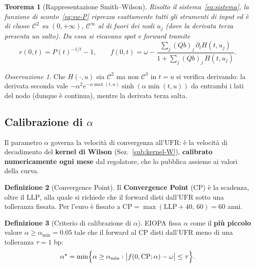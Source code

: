 \documentclass[11pt,a4paper]{article}
\theoremstyle{plain}
\newtheorem{teorema}{Teorema}[section]
\theoremstyle{definition}
\newtheorem{definizione}[teorema]{Definizione}
\theoremstyle{remark}
\newtheorem*{osservazione}{Osservazione}
\newcommand{\UFR}{\mathrm{UFR}}
\newcommand{\LLP}{\mathrm{LLP}}
\newcommand{\CP}{\mathrm{CP}}
\begin{document}
\begin{teorema}[Rappresentazione Smith--Wilson]
\label{thm:rappresentazione}
Risolto il sistema~\eqref{eq:sistema}, la funzione di sconto~\eqref{eq:sw-P} riprezza
esattamente tutti gli strumenti di input ed \`e di classe $\mathcal{C}^2$ su $(0,+\infty)$,
$\mathcal{C}^\infty$ al di fuori dei nodi $u_j$ (dove la derivata terza presenta un salto).
Da essa si ricavano spot e forward tramite
\[
  r(0,t) = P(t)^{-1/t}-1, \qquad
  f(0,t) = \omega - \frac{\sum_j (Qb)_j\,\partial_t H(t,u_j)}{1 + \sum_j (Qb)_j\, H(t,u_j)} .
\]
\end{teorema}

\begin{osservazione}
Che $H(\cdot,u)$ sia $\mathcal{C}^2$ ma non $\mathcal{C}^3$ in $t=u$ si verifica derivando:
la derivata seconda vale $-\alpha^2 e^{-\alpha\max(t,u)}\sinh(\alpha\min(t,u))$ da entrambi
i lati del nodo (dunque \`e continua), mentre la derivata terza salta.

\end{osservazione}

\subsection{Calibrazione di \texorpdfstring{$\alpha$}{alpha}}
\label{sec:alpha-sw}

Il parametro $\alpha$ governa la velocit\`a di convergenza all'$\UFR$: \`e la velocit\`a di
decadimento del \textbf{kernel di Wilson} (Sez.~\ref{sub:kernel-W}), \textbf{calibrato
numericamente ogni mese} dal regolatore, che lo pubblica assieme ai valori della curva.

\begin{definizione}[Convergence Point]
\label{def:cp}
Il \textbf{Convergence Point} ($\CP$) \`e la scadenza, oltre il $\LLP$, alla quale si
richiede che il forward disti dall'$\UFR$ sotto una tolleranza fissata.
Per l'euro \`e fissato a $\CP = \max(\LLP+40,\,60) = 60$ anni.
\end{definizione}

\begin{definizione}[Criterio di calibrazione di $\alpha$]
EIOPA fissa $\alpha$ come il \textbf{pi\`u piccolo} valore $\alpha \ge \alpha_{\min}=0.05$
tale che il forward al $\CP$ disti dall'$\UFR$ meno di una tolleranza $\tau = 1$ bp:
\begin{equation}
  \alpha^\star = \min\Bigl\{\alpha \ge \alpha_{\min} : \bigl|f(0,\CP;\alpha) - \omega\bigr|
  \le \tau \Bigr\}.
  \label{eq:criterio-alpha}
\end{equation}
\end{definizione}
\end{document}
